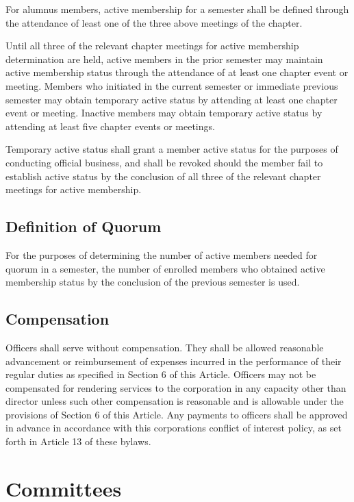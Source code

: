 \documentclass{article}
\begin{document}
	For alumnus members, active membership for a semester shall be defined through the attendance of least one of the three above meetings of the chapter.
	
	Until all three of the relevant chapter meetings for active membership determination are held, active members in the prior semester may maintain active membership status through the attendance of at least one chapter event or meeting. Members who initiated in the current semester or immediate previous semester may obtain temporary active status by attending at least one chapter event or meeting. Inactive members may obtain temporary active status by attending at least five chapter events or meetings.
	
	Temporary active status shall grant a member active status for the purposes of conducting official business, and shall be revoked should the member fail to establish active status by the conclusion of all three of the relevant chapter meetings for active membership. %
	
	\subsection{Definition of Quorum}
	For the purposes of determining the number of active members needed for quorum in a semester, the number of enrolled members who obtained active membership status by the conclusion of the previous semester is used. %
	\subsection{Compensation}
	Officers shall serve without compensation. They shall be allowed reasonable advancement or reimbursement of expenses incurred in the performance of their regular duties as specified in Section 6 of this Article. Officers may not be compensated for rendering services to the corporation in any capacity other than director unless such other compensation is reasonable and is allowable under the provisions of Section 6 of this Article. Any payments to officers shall be approved in advance in accordance with this corporation\textquotesingle s conflict of interest policy, as set forth in Article 13 of these bylaws.
	
	\section{Committees}
\end{document}
